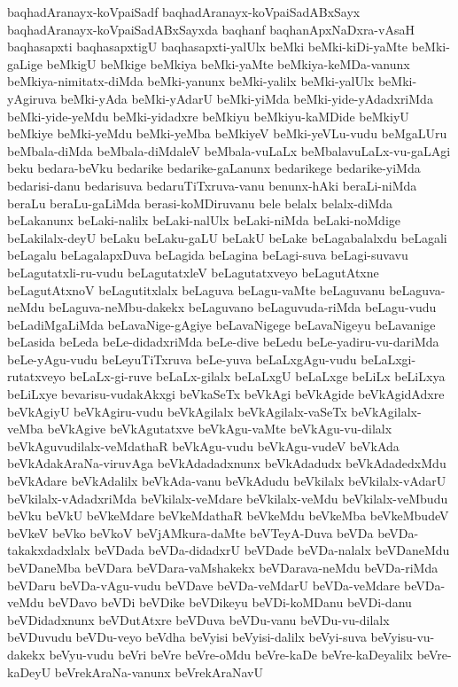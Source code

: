 {baqhadAranayx-koVpaiSadf
baqhadAranayx-koVpaiSadABxSayx
baqhadAranayx-koVpaiSadABxSayxda
baqhanf
baqhanApxNaDxra-vAsaH
baqhasapxti
baqhasapxtigU
baqhasapxti-yalUlx
beMki
beMki-kiDi-yaMte
beMki-gaLige
beMkigU
beMkige
beMkiya
beMki-yaMte
beMkiya-keMDa-vanunx
beMkiya-nimitatx-diMda
beMki-yanunx
beMki-yalilx
beMki-yalUlx
beMki-yAgiruva
beMki-yAda
beMki-yAdarU
beMki-yiMda
beMki-yide-yAdadxriMda
beMki-yide-yeMdu
beMki-yidadxre
beMkiyu
beMkiyu-kaMDide
beMkiyU
beMkiye
beMki-yeMdu
beMki-yeMba
beMkiyeV
beMki-yeVLu-vudu
beMgaLUru
beMbala-diMda
beMbala-diMdaleV
beMbala-vuLaLx
beMbalavuLaLx-vu-gaLAgi
beku
bedara-beVku
bedarike
bedarike-gaLanunx
bedarikege
bedarike-yiMda
bedarisi-danu
bedarisuva
bedaruTiTxruva-vanu
benunx-hAki
beraLi-niMda
beraLu
beraLu-gaLiMda
berasi-koMDiruvanu
bele
belalx
belalx-diMda
beLakanunx
beLaki-nalilx
beLaki-nalUlx
beLaki-niMda
beLaki-noMdige
beLakilalx-deyU
beLaku
beLaku-gaLU
beLakU
beLake
beLagabalalxdu
beLagali
beLagalu
beLagalapxDuva
beLagida
beLagina
beLagi-suva
beLagi-suvavu
beLagutatxli-ru-vudu
beLagutatxleV
beLagutatxveyo
beLagutAtxne
beLagutAtxnoV
beLagutitxlalx
beLaguva
beLagu-vaMte
beLaguvanu
beLaguva-neMdu
beLaguva-neMbu-dakekx
beLaguvano
beLaguvuda-riMda
beLagu-vudu
beLadiMgaLiMda
beLavaNige-gAgiye
beLavaNigege
beLavaNigeyu
beLavanige
beLasida
beLeda
beLe-didadxriMda
beLe-dive
beLedu
beLe-yadiru-vu-dariMda
beLe-yAgu-vudu
beLeyuTiTxruva
beLe-yuva
beLaLxgAgu-vudu
beLaLxgi-rutatxveyo
beLaLx-gi-ruve
beLaLx-gilalx
beLaLxgU
beLaLxge
beLiLx
beLiLxya
beLiLxye
bevarisu-vudakAkxgi
beVkaSeTx
beVkAgi
beVkAgide
beVkAgidAdxre
beVkAgiyU
beVkAgiru-vudu
beVkAgilalx
beVkAgilalx-vaSeTx
beVkAgilalx-veMba
beVkAgive
beVkAgutatxve
beVkAgu-vaMte
beVkAgu-vu-dilalx
beVkAguvudilalx-veMdathaR
beVkAgu-vudu
beVkAgu-vudeV
beVkAda
beVkAdakAraNa-viruvAga
beVkAdadadxnunx
beVkAdadudx
beVkAdadedxMdu
beVkAdare
beVkAdalilx
beVkAda-vanu
beVkAdudu
beVkilalx
beVkilalx-vAdarU
beVkilalx-vAdadxriMda
beVkilalx-veMdare
beVkilalx-veMdu
beVkilalx-veMbudu
beVku
beVkU
beVkeMdare
beVkeMdathaR
beVkeMdu
beVkeMba
beVkeMbudeV
beVkeV
beVko
beVkoV
beVjAMkura-daMte
beVTeyA-Duva
beVDa
beVDa-takakxdadxlalx
beVDada
beVDa-didadxrU
beVDade
beVDa-nalalx
beVDaneMdu
beVDaneMba
beVDara
beVDara-vaMshakekx
beVDarava-neMdu
beVDa-riMda
beVDaru
beVDa-vAgu-vudu
beVDave
beVDa-veMdarU
beVDa-veMdare
beVDa-veMdu
beVDavo
beVDi
beVDike
beVDikeyu
beVDi-koMDanu
beVDi-danu
beVDidadxnunx
beVDutAtxre
beVDuva
beVDu-vanu
beVDu-vu-dilalx
beVDuvudu
beVDu-veyo
beVdha
beVyisi
beVyisi-dalilx
beVyi-suva
beVyisu-vu-dakekx
beVyu-vudu
beVri
beVre
beVre-oMdu
beVre-kaDe
beVre-kaDeyalilx
beVre-kaDeyU
beVrekAraNa-vanunx
beVrekAraNavU
}
